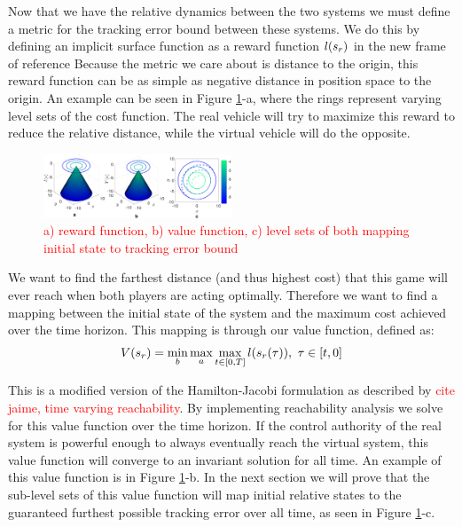 Now that we have the relative dynamics between the two systems we must define a metric for the tracking error bound between these systems. We do this by defining an implicit surface function as a reward function $l(s_r)$ in the new frame of reference  Because the metric we care about is distance to the origin, this reward function can be as simple as negative distance in position space to the origin. An example can be seen in Figure \ref{fig:quad4D_example}-a, where the rings represent varying level sets of the cost function. The real vehicle will try to maximize this reward to reduce the relative distance, while the virtual vehicle will do the opposite.

\begin{figure}
	\centering
	\includegraphics[width=0.5\textwidth]{fig/quad4D_example}
	\caption{\textcolor{red}{a) reward function, b) value function, c) level sets of both mapping initial state to tracking error bound}}
	\label{fig:quad4D_example}
\end{figure} 
 
 We want to find the farthest distance (and thus highest cost) that this game will ever reach when both players are acting optimally. Therefore we want to find a mapping between the initial state of the system and the maximum cost achieved over the time horizon. This mapping is through our value function, defined as:
 \begin{equation}
 \begin{aligned}
 	V(s_r)= \min_{b} \max_{a} \max_{t\in [0,T]} l(s_r(\tau)), \ \tau \in [t, 0]
 	\end{aligned}
 \end{equation} 
 
 This is a modified version of the Hamilton-Jacobi formulation as described by \textcolor{red}{cite jaime, time varying reachability}. By implementing reachability analysis we solve for this value function over the time horizon. If the control authority of the real system is powerful enough to always eventually reach the virtual system, this value function will converge to an invariant solution for all time.  An example of this value function is in Figure \ref{fig:quad4D_example}-b. In the next section we will prove that the sub-level sets of this value function will map initial relative states to the guaranteed furthest possible tracking error over all time, as seen in Figure \ref{fig:quad4D_example}-c.
 
